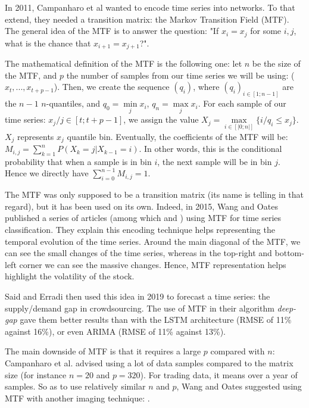 \documentclass[11pt]{article}
\begin{document}
\begin{onehalfspace}
In 2011, Campanharo et al \cite{campanharo} wanted to encode time series into networks. To that extend, they needed a transition matrix: the Markov Transition Field (MTF). The general idea of the MTF is to answer the question: "If $x_i = x_j$ for some $i,j$, what is the chance that $x_{i+1} = x_{j+1}$?". 

The mathematical definition of the MTF is the following one: let $n$ be the size of the MTF, and $p$ the number of samples from our time series we will be using: ($x_t,...,x_{t+p-1}$). Then, we create the sequence $(q_i)$, where $(q_i)_{i \in [1;n-1]}$ are the $n-1$ $n$-quantiles, and $q_0 = \min\limits_j x_i$, $q_n = \max\limits_j x_i$. For each sample of our time series: $x_j / j \in [t;t+p-1]$, we assign the value $X_j = \max\limits_{i \in [|0;n|]} \{ i / q_i \leq x_j\}$. $X_j$ represents $x_j$ quantile bin. Eventually, the coefficients of the MTF will be: $M_{i,j} = \sum\limits_{k=1}^{n} P(X_k = j | X_{k-1} = i)$. In other words, this is the conditional probability that when a sample is in bin $i$, the next sample will be in bin $j$. Hence we directly have $\sum\limits_{i=0}^{n-1} M_{i,j} = 1$. 

The MTF was only supposed to be a transition matrix (its name is telling in that regard), but it has been used on its own. Indeed, in 2015, Wang and Oates published a series of articles (among which \cite{wang} and \cite{wang_encod}) using MTF for time series classification. They explain this encoding technique helps representing the temporal evolution of the time series. Around the main diagonal of the MTF, we can see the small changes of the time series, whereas in the top-right and bottom-left corner we can see the massive changes. Hence, MTF representation helps highlight the volatility of the stock. 

Said and Erradi \cite{said} then used this idea in 2019 to forecast a time series: the supply/demand gap in crowdsourcing. The use of MTF in their algorithm \emph{deep-gap} gave them better results than with the LSTM architecture (RMSE of 11\% against 16\%), or even ARIMA (RMSE of 11\% against 13\%).

The main downside of MTF is that it requires a large $p$ compared with $n$: Campanharo et al. \cite{campanharo} advised using a lot of data samples compared to the matrix size (for instance $n = 20$ and $p = 320$). For trading data, it means over a year of samples. So as to use relatively similar $n$ and $p$, Wang and Oates \cite{wang_encod} suggested using MTF with another imaging technique: .


\end{onehalfspace}
\end{document}
